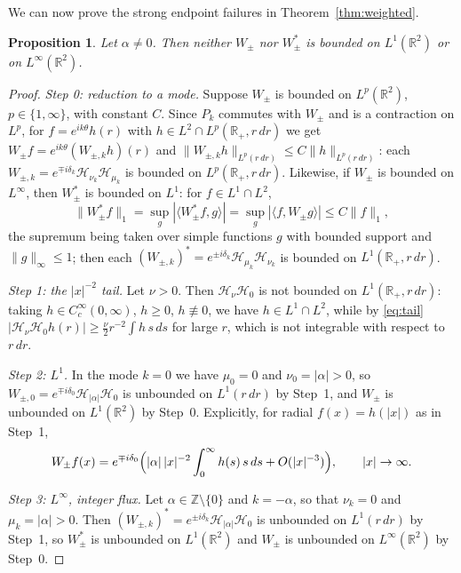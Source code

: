 \documentclass[11pt,a4paper,reqno,backref=page]{amsart}
\newcommand{\R}{\mathbb R}
\newcommand{\Z}{\mathbb Z}
\newcommand{\HH}{\mathcal H}                 %
\numberwithin{equation}{section}
\newtheorem{proposition}[theorem]{Proposition}
\theoremstyle{definition}
\theoremstyle{remark}
\begin{document}
We can now prove the strong endpoint failures in
Theorem~\ref{thm:weighted}.

\begin{proposition}\label{prop:endpoints}
Let $\alpha\ne0$. Then neither $W_\pm$ nor $W_\pm^*$ is bounded
on $L^1(\R^2)$ or on $L^\infty(\R^2)$.
\end{proposition}

\begin{proof}
\emph{Step 0: reduction to a mode.} Suppose $W_\pm$ is bounded
on $L^p(\R^2)$, $p\in\{1,\infty\}$, with constant $C$. Since
$P_k$ commutes with $W_\pm$ and is a contraction on $L^p$, for
$f=e^{ik\theta}h(r)$ with $h\in L^2\cap L^p(\R_+,r\,dr)$ we get
$W_\pm f=e^{ik\theta}(W_{\pm,k}h)(r)$ and
$\|W_{\pm,k}h\|_{L^p(r\,dr)}\le C\|h\|_{L^p(r\,dr)}$: each
$W_{\pm,k}=e^{\mp i\delta_k}\HH_{\nu_k}\HH_{\mu_k}$ is bounded
on $L^p(\R_+,r\,dr)$. Likewise, if $W_\pm$ is bounded on
$L^\infty$, then $W_\pm^*$ is bounded on $L^1$: for $f\in
L^1\cap L^2$,
\begin{equation*}
  \|W_\pm^*f\|_1=\sup_{g}|\langle W_\pm^*f,g\rangle|
  =\sup_{g}|\langle f,W_\pm g\rangle|\le C\|f\|_1,
\end{equation*}
the supremum being taken over simple functions $g$ with bounded
support and $\|g\|_\infty\le1$; then each $(W_{\pm,k})^*=e^{\pm
i\delta_k}\HH_{\mu_k}\HH_{\nu_k}$ is bounded on
$L^1(\R_+,r\,dr)$.

\emph{Step 1: the $|x|^{-2}$ tail.} Let $\nu>0$. Then
$\HH_\nu\HH_0$ is not bounded on $L^1(\R_+,r\,dr)$: taking $h\in
C_c^\infty(0,\infty)$, $h\ge0$, $h\not\equiv0$, we have $h\in
L^1\cap L^2$, while by \eqref{eq:tail}
$|\HH_\nu\HH_0h(r)|\ge\frac\nu2 r^{-2}\int h\,s\,ds$ for large
$r$, which is not integrable with respect to $r\,dr$.

\emph{Step 2: $L^1$.} In the mode $k=0$ we have $\mu_0=0$ and
$\nu_0=|\alpha|>0$, so $W_{\pm,0}=e^{\mp
i\delta_0}\HH_{|\alpha|}\HH_0$ is unbounded on $L^1(r\,dr)$ by
Step~1, and $W_\pm$ is unbounded on $L^1(\R^2)$ by Step~0.
Explicitly, for radial $f(x)=h(|x|)$ as in Step~1,
\begin{equation*}
  W_\pm f(x)=e^{\mp
  i\delta_0}\Bigl(|\alpha|\,|x|^{-2}\int_0^\infty
  h(s)\,s\,ds+O(|x|^{-3})\Bigr),
  \qquad |x|\to\infty.
\end{equation*}

\emph{Step 3: $L^\infty$, integer flux.} Let
$\alpha\in\Z\setminus\{0\}$ and $k=-\alpha$, so that $\nu_k=0$
and $\mu_k=|\alpha|>0$. Then $(W_{\pm,k})^*=e^{\pm
i\delta_k}\HH_{|\alpha|}\HH_0$ is unbounded on $L^1(r\,dr)$ by
Step~1, so $W_\pm^*$ is unbounded on $L^1(\R^2)$ and $W_\pm$ is
unbounded on $L^\infty(\R^2)$ by Step~0.


\end{proof}
\end{document}
